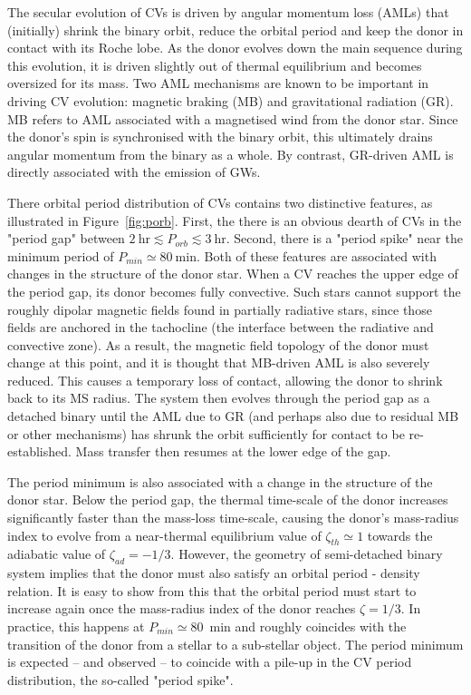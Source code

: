 \documentclass[fleqn,usenatbib]{mnras}
\begin{document}
The secular evolution of CVs is driven by angular momentum loss (AMLs) that (initially) shrink the binary orbit, reduce the orbital period and keep the donor in contact with its Roche lobe. As the donor evolves down the main sequence during this evolution, it is driven slightly out of thermal equilibrium and becomes oversized for its mass. Two AML mechanisms are known to be important in driving CV evolution: magnetic braking (MB) and gravitational radiation (GR). MB refers to AML associated with a magnetised wind from the donor star. Since the donor's spin is synchronised with the binary orbit, this ultimately drains angular momentum from the binary as a whole. By contrast, GR-driven AML is directly associated with the emission of GWs.  

There orbital period distribution of CVs contains two distinctive features, as illustrated in Figure~\ref{fig:porb}. First, the there is an obvious dearth of CVs in the "period gap" between $2~\mathrm{hr} \lesssim P_{orb} \lesssim 3~\mathrm{hr}$. Second, there is a "period spike" near the minimum period of $P_{min} \simeq 80~\mathrm{min}$. Both of these features are associated with changes in the structure of the donor star. When a CV reaches the upper edge of the period gap, its donor becomes fully convective. Such stars cannot support the roughly dipolar magnetic fields found in partially radiative stars, since those fields are anchored in the tachocline (the interface between the radiative and convective zone). As a result, the magnetic field topology of the donor must change at this point, and it is thought that MB-driven AML is also severely reduced. This causes a temporary loss of contact, allowing the donor to shrink back to its MS radius. The system then evolves through the period gap as a detached binary until the AML due to GR (and perhaps also due to residual MB or other mechanisms) has shrunk the orbit sufficiently for contact to be re-established. Mass transfer then resumes at the lower edge of the gap.

The period minimum is also associated with a change in the structure of the donor star. Below the period gap, the thermal time-scale of the donor increases significantly faster than the mass-loss time-scale, causing the donor's mass-radius index to evolve from a near-thermal equilibrium value of  $\zeta_{th} \simeq 1$ towards the adiabatic value of $\zeta_{ad} = -1/3$. However, the geometry of semi-detached binary system implies that the donor must also satisfy an orbital period - density relation. It is easy to show from this that the orbital period must start to increase again once the mass-radius index of the donor reaches $\zeta = 1/3$. In practice, this happens at $P_{min} \simeq 80$~min and roughly coincides with the transition of the donor from a stellar to a sub-stellar object. The period minimum is expected -- and observed -- to coincide with a pile-up in the CV period distribution, the so-called "period spike".
\end{document}
